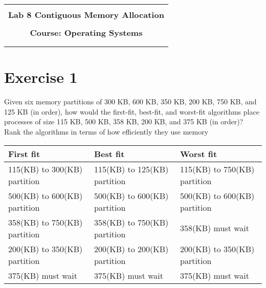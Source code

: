 \documentclass[11pt]{article}
\begin{document}
\begin{flushleft}
    \begin{tabular}{c}
        \\ \\ \hline \\
        \multicolumn{1}{l}{\textbf{{\Huge Lab 8 Contiguous Memory Allocation}}}		
        \\ \\
        \textbf{{\Huge Course: Operating Systems}}		            
        \\ \\ \hline \\
    \end{tabular}
\end{flushleft}


\vspace{0.5cm}

\section*{Exercise 1}
Given six memory partitions of 300 KB, 600 KB, 350 KB, 200 KB, 750 KB, and 125
KB (in order), how would the first-fit, best-fit, and worst-fit algorithms place processes
of size 115 KB, 500 KB, 358 KB, 200 KB, and 375 KB (in order)? Rank the algorithms
in terms of how efficiently they use memory

\begin{table}[!htp]
    \centering
    \def\arraystretch{1.6}

    \begin{tabular}{|l|l|l|}
        \hline
        First fit                    & Best fit                     & Worst fit                    \\ \hline
        115(KB) to 300(KB) partition & 115(KB) to 125(KB) partition & 115(KB) to 750(KB) partition \\ \hline
        500(KB) to 600(KB) partition & 500(KB) to 600(KB) partition & 500(KB) to 600(KB) partition \\ \hline
        358(KB) to 750(KB) partition & 358(KB) to 750(KB) partition & 358(KB) must wait            \\ \hline
        200(KB) to 350(KB) partition & 200(KB) to 200(KB) partition & 200(KB) to 350(KB) partition \\ \hline
        375(KB) must wait            & 375(KB) must wait            & 375(KB) must wait            \\ \hline
    \end{tabular}
\end{table}
\end{document}
